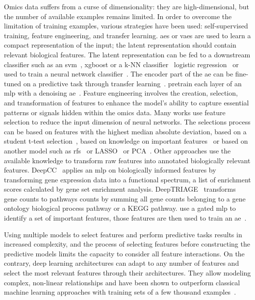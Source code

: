 \documentclass[../main.tex]{subfiles}
\begin{document}
	Omics data suffers from a curse of dimensionality: they are high-dimensional, but the number of available examples remains limited.
	In order to overcome the limitation of training examples, various strategies have been used: self-supervised training, feature engineering, and transfer learning.
	\Glspl{ae} or \glspl{vae} are used to learn a compact representation of the input; the latent representation should contain relevant biological features.
	The latent representation can be fed to a downstream classifier such as an \gls{svm}~\cite{Zhang2020}, \gls{xgboost} or a k-NN classifier~\cite{Arafa2023} logistic regression~\cite{Wang2018} or used to train a neural network classifier~\cite{Karim2019}.
	The encoder part of the \gls{ae} can be fine-tuned on a predictive task through transfer learning~\cite{Levy2020,Kaczmarek2022}.
	\citeauthor{Hanczar2018} pretrain each layer of an \gls{mlp} with a denoising \gls{ae}~\cite{Hanczar2018}.
	Feature engineering involves the creation, selection, and transformation of features to enhance the model's ability to capture essential patterns or signals hidden within the omics data.
	Many works use feature selection to reduce the input dimension of neural networks.
	The selections process can be based on features with the highest median absolute deviation, based on a student t-test selection~\cite{Liu2019}, based on knowledge on important features~\cite{Kaczmarek2022} or based on another model such as \glspl{rf}~\cite{Wojewodzic2021,Liu2019} or LASSO~\cite{Liu2019} or PCA~\cite{Yu2019}.
	Other approaches use the available knowledge to transform raw features into annotated biologically relevant features.
	DeepCC~\cite{gaoDeepCCNovelDeep2019} applies an \gls{mlp} on biologically informed features by transforming gene expression data into a functional spectrum, \ie{}a list of enrichment scores calculated by gene set enrichment analysis.
	DeepTRIAGE~\cite{beykikhoshkDeepTRIAGEInterpretableIndividualised2020a} transforms gene counts to pathways counts by summing all gene counts belonging to a gene ontology biological process pathway or a KEGG pathway.
	\citeauthor{Zhang2020} use a gated \gls{mlp} to identify a set of important features, those features are then used to train an \gls{ae}~\cite{Zhang2020}.

	Using multiple models to select features and perform predictive tasks results in increased complexity, and the process of selecting features before constructing the predictive models limits the capacity to consider all feature interactions.
	On the contrary, deep learning architectures can adapt to any number of features and select the most relevant features through their architectures.
	They allow modeling complex, non-linear relationships and have been shown to outperform classical machine learning approaches with training sets of a few thousand examples~\cite{Hanczar2022}.
\end{document}
